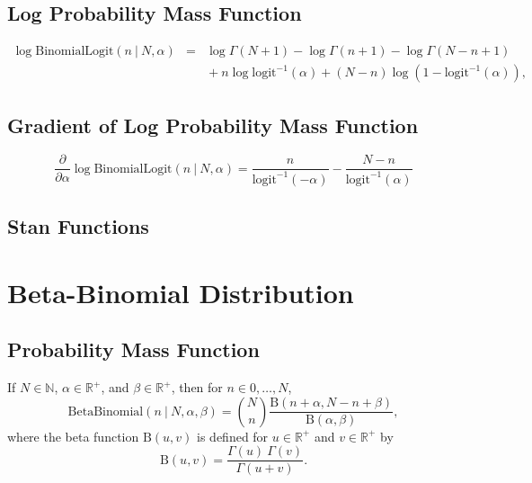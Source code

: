 \begin{description}
{\begin{description}
\subsection{Log Probability Mass Function}

\begin{eqnarray*} \log \text{BinomialLogit}(n~|~N,\alpha) & = & \log \Gamma(N+1) - \log \Gamma(n + 1) - \log \Gamma(N- n + 1) \\[4pt]   & &  { } + n \log \text{logit}^{-1}(\alpha) + (N - n) \log \left( 1 -   \text{logit}^{-1}(\alpha) \right), \end{eqnarray*}


\subsection{Gradient of Log Probability Mass Function}

 \[ \frac{\partial}{\partial \alpha} \log \text{BinomialLogit}(n~|~N,\alpha) = \frac{n}{\text{logit}^{-1}(-\alpha)} - \frac{N - n}{\text{logit}^{-1}(\alpha)} \] 



\subsection{Stan Functions}


\begin{description}    \end{description}


\section{Beta-Binomial Distribution}


\subsection{Probability Mass Function}


If $N \in \mathbb{N}$, $\alpha \in \mathbb{R}^+$, and $\beta \in \mathbb{R}^+$, then for $n \in {0,\ldots,N}$, \[ \text{BetaBinomial}(n~|~N,\alpha,\beta) = \binom{N}{n} \frac{\mathrm{B}(n+\alpha, N -n +   \beta)}{\mathrm{B}(\alpha,\beta)}, \] where the beta function $\mathrm{B}(u,v)$ is defined for $u \in \mathbb{R}^+$ and $v \in \mathbb{R}^+$ by \[ \mathrm{B}(u,v) = \frac{\Gamma(u) \ \Gamma(v)}{\Gamma(u + v)}. \] 


\end{description}}
\end{description}
